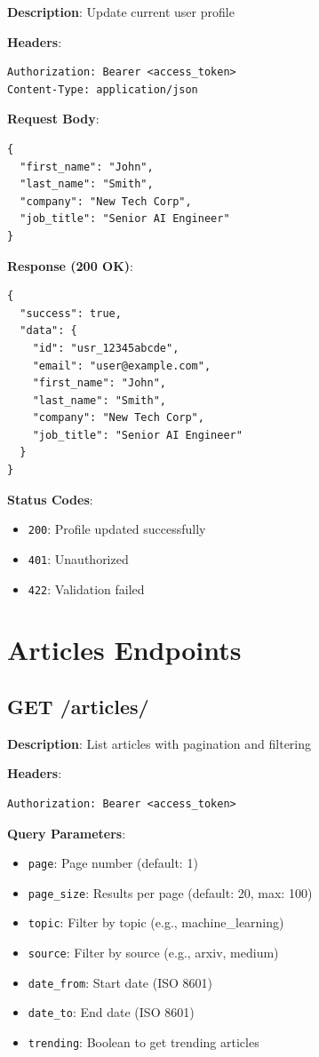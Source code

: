 \documentclass[12pt,a4paper]{report}
\begin{document}
\textbf{Description}: Update current user profile

\textbf{Headers}:
\begin{lstlisting}
Authorization: Bearer <access_token>
Content-Type: application/json
\end{lstlisting}

\textbf{Request Body}:
\begin{lstlisting}
{
  "first_name": "John",
  "last_name": "Smith",
  "company": "New Tech Corp",
  "job_title": "Senior AI Engineer"
}
\end{lstlisting}

\textbf{Response (200 OK)}:
\begin{lstlisting}
{
  "success": true,
  "data": {
    "id": "usr_12345abcde",
    "email": "user@example.com",
    "first_name": "John",
    "last_name": "Smith",
    "company": "New Tech Corp",
    "job_title": "Senior AI Engineer"
  }
}
\end{lstlisting}

\textbf{Status Codes}:
\begin{itemize}
    \item \texttt{200}: Profile updated successfully
    \item \texttt{401}: Unauthorized
    \item \texttt{422}: Validation failed
\end{itemize}


\chapter{Articles Endpoints}

\section{GET /articles/}

\textbf{Description}: List articles with pagination and filtering

\textbf{Headers}:
\begin{lstlisting}
Authorization: Bearer <access_token>
\end{lstlisting}

\textbf{Query Parameters}:
\begin{itemize}
    \item \texttt{page}: Page number (default: 1)
    \item \texttt{page\_size}: Results per page (default: 20, max: 100)
    \item \texttt{topic}: Filter by topic (e.g., machine\_learning)
    \item \texttt{source}: Filter by source (e.g., arxiv, medium)
    \item \texttt{date\_from}: Start date (ISO 8601)
    \item \texttt{date\_to}: End date (ISO 8601)
    \item \texttt{trending}: Boolean to get trending articles
\end{itemize}
\end{document}
